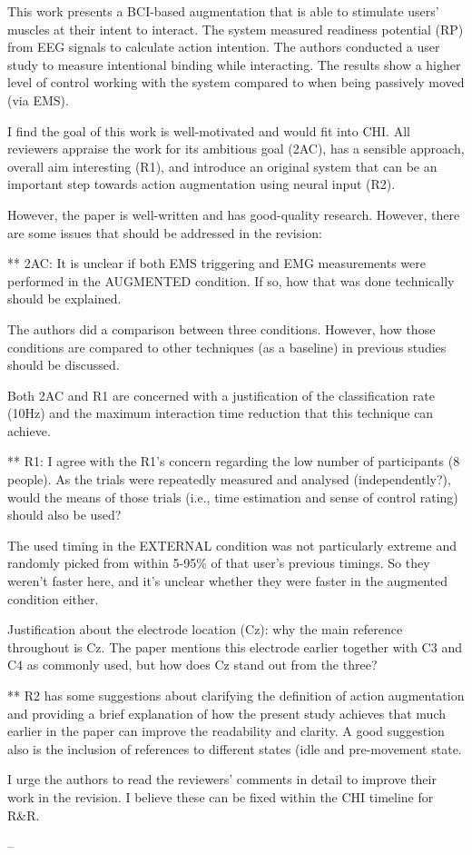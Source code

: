 This work presents a BCI-based augmentation that is able to stimulate users' muscles at their intent to interact. The system measured readiness potential (RP) from EEG signals to calculate action intention. The authors conducted a user study to measure intentional binding while interacting. The results show a higher level of control working with the system compared to when being passively moved (via EMS).

I find the goal of this work is well-motivated and would fit into CHI. All reviewers appraise the work for its ambitious goal (2AC), has a sensible approach, overall aim interesting (R1), and introduce an original system that can be an important step towards action augmentation using neural input (R2).

However, the paper is well-written and has good-quality research. However, there are some issues that should be addressed in the revision:

** 2AC: 
It is unclear if both EMS triggering and EMG measurements were performed in the AUGMENTED condition. If so, how that was done technically should be explained.

The authors did a comparison between three conditions. However, how those conditions are compared to other techniques (as a baseline) in previous studies should be discussed.

Both 2AC and R1 are concerned with a justification of the classification rate (10Hz) and the maximum interaction time reduction that this technique can achieve.

** R1: 
I agree with the R1's concern regarding the low number of participants (8 people). As the trials were repeatedly measured and analysed (independently?), would the means of those trials (i.e., time estimation and sense of control rating) should also be used?

The used timing in the EXTERNAL condition was not particularly extreme and randomly picked from within 5-95\% of that user's previous timings. So they weren't faster here, and it's unclear whether they were faster in the augmented condition either.

Justification about the electrode location (Cz): why the main reference throughout is Cz. The paper mentions this electrode earlier together with C3 and C4 as commonly used, but how does Cz stand out from the three?

** R2 has some suggestions about clarifying the definition of action augmentation and providing a brief explanation of how the present study achieves that much earlier in the paper can improve the readability and clarity. A good suggestion also is the inclusion of references to different states (idle and pre-movement state.

I urge the authors to read the reviewers' comments in detail to improve their work in the revision. I believe these can be fixed within the CHI timeline for R&R.


--